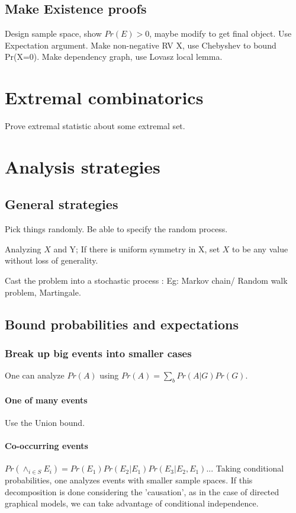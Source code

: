 \documentclass[oneside, article]{memoir}
\begin{document}
\section{Make Existence proofs}
Design sample space, show $Pr(E)>0$, maybe modify to get final object. Use Expectation argument. Make non-negative RV X, use Chebyshev to bound Pr(X=0). Make dependency graph, use Lovasz local lemma.

\chapter{Extremal combinatorics}
Prove extremal statistic about some extremal set. \tbc

\chapter{Analysis strategies}
\section{General strategies}
Pick things randomly. Be able to specify the random process.

Analyzing $X$ and Y; If there is uniform symmetry in X, set $X$ to be any value without loss of generality.

Cast the problem into a stochastic process : Eg: Markov chain/ Random walk problem, Martingale.

\section{Bound probabilities and expectations}
\subsection{Break up big events into smaller cases}
One can analyze $Pr(A)$ using $Pr(A) = \sum_b Pr(A|G)Pr(G)$.

\subsubsection{One of many events}
Use the Union bound.

\subsubsection{Co-occurring events}
$Pr(\land_{i \in S} E_i) = Pr(E_1)Pr(E_2|E_1) Pr(E_3|E_2, E_1)..$. Taking conditional probabilities, one analyzes events with smaller sample spaces. If this decomposition is done considering the 'causation', as in the case of  directed graphical models, we can take advantage of conditional independence.
\end{document}
